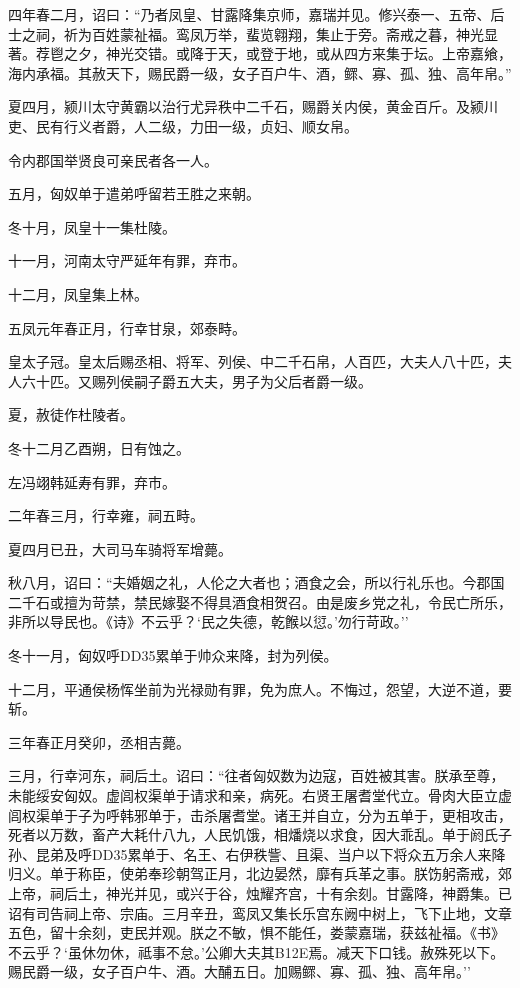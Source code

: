 \documentclass[]{article}
\begin{document}
四年春二月，诏曰：``乃者凤皇、甘露降集京师，嘉瑞并见。修兴泰一、五帝、后士之祠，祈为百姓蒙祉福。鸾凤万举，蜚览翱翔，集止于旁。斋戒之暮，神光显著。荐鬯之夕，神光交错。或降于天，或登于地，或从四方来集于坛。上帝嘉飨，海内承福。其赦天下，赐民爵一级，女子百户牛、酒，鳏、寡、孤、独、高年帛。''

夏四月，颍川太守黄霸以治行尤异秩中二千石，赐爵关内侯，黄金百斤。及颍川吏、民有行义者爵，人二级，力田一级，贞妇、顺女帛。

令内郡国举贤良可亲民者各一人。

五月，匈奴单于遣弟呼留若王胜之来朝。

冬十月，凤皇十一集杜陵。

十一月，河南太守严延年有罪，弃市。

十二月，凤皇集上林。

五凤元年春正月，行幸甘泉，郊泰畤。

皇太子冠。皇太后赐丞相、将军、列侯、中二千石帛，人百匹，大夫人八十匹，夫人六十匹。又赐列侯嗣子爵五大夫，男子为父后者爵一级。

夏，赦徒作杜陵者。

冬十二月乙酉朔，日有蚀之。

左冯翊韩延寿有罪，弃市。

二年春三月，行幸雍，祠五畤。

夏四月已丑，大司马车骑将军增薨。

秋八月，诏曰：``夫婚姻之礼，人伦之大者也；酒食之会，所以行礼乐也。今郡国二千石或擅为苛禁，禁民嫁娶不得具酒食相贺召。由是废乡党之礼，令民亡所乐，非所以导民也。《诗》不云乎？`民之失德，乾餱以愆。'勿行苛政。''

冬十一月，匈奴呼DD35累单于帅众来降，封为列侯。

十二月，平通侯杨恽坐前为光禄勋有罪，免为庶人。不悔过，怨望，大逆不道，要斩。

三年春正月癸卯，丞相吉薨。

三月，行幸河东，祠后土。诏曰：``往者匈奴数为边寇，百姓被其害。朕承至尊，未能绥安匈奴。虚闾权渠单于请求和亲，病死。右贤王屠耆堂代立。骨肉大臣立虚闾权渠单于子为呼韩邪单于，击杀屠耆堂。诸王并自立，分为五单于，更相攻击，死者以万数，畜产大耗什八九，人民饥饿，相燔烧以求食，因大乖乱。单于阏氏子孙、昆弟及呼DD35累单于、名王、右伊秩訾、且渠、当户以下将众五万余人来降归义。单于称臣，使弟奉珍朝驾正月，北边晏然，靡有兵革之事。朕饬躬斋戒，郊上帝，祠后土，神光并见，或兴于谷，烛耀齐宫，十有余刻。甘露降，神爵集。已诏有司告祠上帝、宗庙。三月辛丑，鸾凤又集长乐宫东阙中树上，飞下止地，文章五色，留十余刻，吏民并观。朕之不敏，惧不能任，娄蒙嘉瑞，获兹祉福。《书》不云乎？`虽休勿休，祗事不怠。'公卿大夫其B12E焉。减天下口钱。赦殊死以下。赐民爵一级，女子百户牛、酒。大酺五日。加赐鳏、寡、孤、独、高年帛。''
\end{document}
